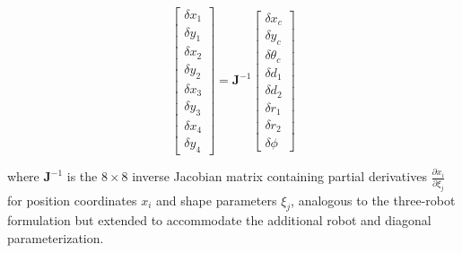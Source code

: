 \documentclass[lettersize,journal]{IEEEtran}
\begin{document}
\begin{equation}
\begin{bmatrix}
\delta x_1 \\ \delta y_1 \\ \delta x_2 \\ \delta y_2 \\ \delta x_3 \\ \delta y_3 \\ \delta x_4 \\ \delta y_4
\end{bmatrix} =
\mathbf{J}^{-1}
\begin{bmatrix}
\delta x_c \\ \delta y_c \\ \delta \theta_c \\ \delta d_1 \\ \delta d_2 \\ \delta r_1 \\ \delta r_2 \\ \delta \phi
\end{bmatrix}
\end{equation}

where $\mathbf{J}^{-1}$ is the $8 \times 8$ inverse Jacobian matrix containing partial derivatives $\frac{\partial x_i}{\partial \xi_j}$ for position coordinates $x_i$ and shape parameters $\xi_j$, analogous to the three-robot formulation but extended to accommodate the additional robot and diagonal parameterization.
\end{document}
